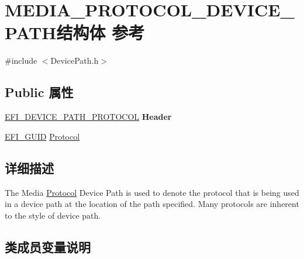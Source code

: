 \hypertarget{struct_m_e_d_i_a___p_r_o_t_o_c_o_l___d_e_v_i_c_e___p_a_t_h}{}\section{M\+E\+D\+I\+A\+\_\+\+P\+R\+O\+T\+O\+C\+O\+L\+\_\+\+D\+E\+V\+I\+C\+E\+\_\+\+P\+A\+T\+H结构体 参考}
\label{struct_m_e_d_i_a___p_r_o_t_o_c_o_l___d_e_v_i_c_e___p_a_t_h}


{\ttfamily \#include $<$Device\+Path.\+h$>$}

\subsection*{Public 属性}
\begin{DoxyCompactItemize}
\item 
\mbox{\label{struct_m_e_d_i_a___p_r_o_t_o_c_o_l___d_e_v_i_c_e___p_a_t_h_a9b7ecfff82194c82c4214109086b5573}} 
\hyperlink{struct_e_f_i___d_e_v_i_c_e___p_a_t_h___p_r_o_t_o_c_o_l}{E\+F\+I\+\_\+\+D\+E\+V\+I\+C\+E\+\_\+\+P\+A\+T\+H\+\_\+\+P\+R\+O\+T\+O\+C\+OL} {\bfseries Header}
\item 
\hyperlink{_uefi_base_type_8h_ad87614428813f71edb2c2d802e9ce2af}{E\+F\+I\+\_\+\+G\+U\+ID} \hyperlink{struct_m_e_d_i_a___p_r_o_t_o_c_o_l___d_e_v_i_c_e___p_a_t_h_a45597acbb55c84cf0ec4b45be1c5934c}{Protocol}
\end{DoxyCompactItemize}


\subsection{详细描述}
The Media \hyperlink{struct_protocol}{Protocol} Device Path is used to denote the protocol that is being used in a device path at the location of the path specified. Many protocols are inherent to the style of device path. 

\subsection{类成员变量说明}
\mbox{\label{struct_m_e_d_i_a___p_r_o_t_o_c_o_l___d_e_v_i_c_e___p_a_t_h_a45597acbb55c84cf0ec4b45be1c5934c}} 
